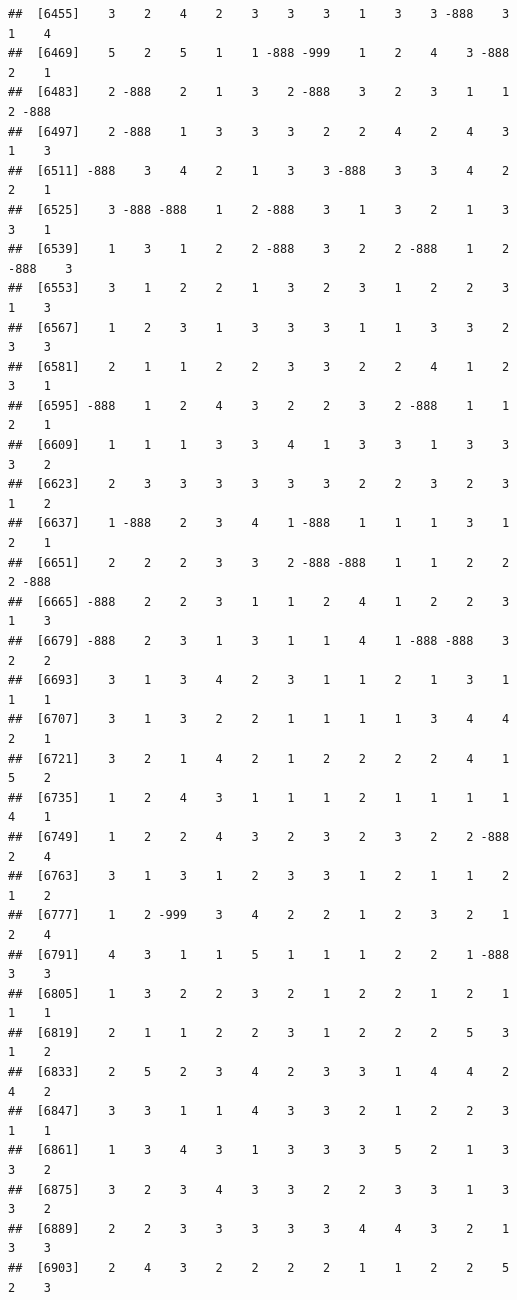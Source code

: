 \documentclass[
  12pt,
  openany]{book}
\begin{document}
\begin{verbatim}
##  [6455]    3    2    4    2    3    3    3    1    3    3 -888    3    1    4
##  [6469]    5    2    5    1    1 -888 -999    1    2    4    3 -888    2    1
##  [6483]    2 -888    2    1    3    2 -888    3    2    3    1    1    2 -888
##  [6497]    2 -888    1    3    3    3    2    2    4    2    4    3    1    3
##  [6511] -888    3    4    2    1    3    3 -888    3    3    4    2    2    1
##  [6525]    3 -888 -888    1    2 -888    3    1    3    2    1    3    3    1
##  [6539]    1    3    1    2    2 -888    3    2    2 -888    1    2 -888    3
##  [6553]    3    1    2    2    1    3    2    3    1    2    2    3    1    3
##  [6567]    1    2    3    1    3    3    3    1    1    3    3    2    3    3
##  [6581]    2    1    1    2    2    3    3    2    2    4    1    2    3    1
##  [6595] -888    1    2    4    3    2    2    3    2 -888    1    1    2    1
##  [6609]    1    1    1    3    3    4    1    3    3    1    3    3    3    2
##  [6623]    2    3    3    3    3    3    3    2    2    3    2    3    1    2
##  [6637]    1 -888    2    3    4    1 -888    1    1    1    3    1    2    1
##  [6651]    2    2    2    3    3    2 -888 -888    1    1    2    2    2 -888
##  [6665] -888    2    2    3    1    1    2    4    1    2    2    3    1    3
##  [6679] -888    2    3    1    3    1    1    4    1 -888 -888    3    2    2
##  [6693]    3    1    3    4    2    3    1    1    2    1    3    1    1    1
##  [6707]    3    1    3    2    2    1    1    1    1    3    4    4    2    1
##  [6721]    3    2    1    4    2    1    2    2    2    2    4    1    5    2
##  [6735]    1    2    4    3    1    1    1    2    1    1    1    1    4    1
##  [6749]    1    2    2    4    3    2    3    2    3    2    2 -888    2    4
##  [6763]    3    1    3    1    2    3    3    1    2    1    1    2    1    2
##  [6777]    1    2 -999    3    4    2    2    1    2    3    2    1    2    4
##  [6791]    4    3    1    1    5    1    1    1    2    2    1 -888    3    3
##  [6805]    1    3    2    2    3    2    1    2    2    1    2    1    1    1
##  [6819]    2    1    1    2    2    3    1    2    2    2    5    3    1    2
##  [6833]    2    5    2    3    4    2    3    3    1    4    4    2    4    2
##  [6847]    3    3    1    1    4    3    3    2    1    2    2    3    1    1
##  [6861]    1    3    4    3    1    3    3    3    5    2    1    3    3    2
##  [6875]    3    2    3    4    3    3    2    2    3    3    1    3    3    2
##  [6889]    2    2    3    3    3    3    3    4    4    3    2    1    3    3
##  [6903]    2    4    3    2    2    2    2    1    1    2    2    5    2    3

\end{verbatim}
\end{document}
